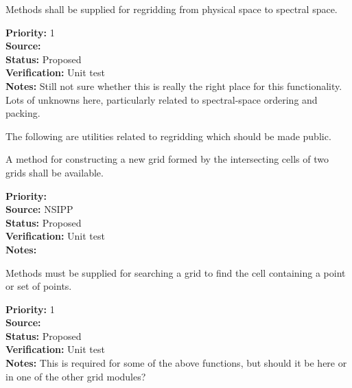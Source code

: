 
Methods shall be supplied for regridding from physical space to
spectral space.

\begin{reqlist}
{\bf Priority:} 1 \\
{\bf Source:}  \\
{\bf Status:} Proposed \\
{\bf Verification:} Unit test \\
{\bf Notes:} Still not sure whether this is really the right place
             for this functionality.
             Lots of unknowns here, particularly related to
             spectral-space ordering and packing.
\end{reqlist}


The following are utilities related to regridding which should be made
public.


A method for constructing a new grid formed by the intersecting
cells of two grids shall be available.

\begin{reqlist}
{\bf Priority:}  \\
{\bf Source:}  NSIPP \\
{\bf Status:} Proposed \\
{\bf Verification:} Unit test \\
{\bf Notes:} 
\end{reqlist}


Methods must be supplied for searching a grid to find the cell
containing a point or set of points.

\begin{reqlist}
{\bf Priority:} 1 \\
{\bf Source:}  \\
{\bf Status:} Proposed \\
{\bf Verification:} Unit test \\
{\bf Notes:} This is required for some of the above functions, but
             should it be here or in one of the other grid modules?
\end{reqlist}

